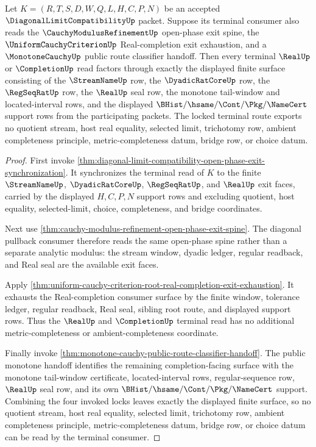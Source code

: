 \begin{theorem}
\label{thm:diagonal-limit-compatibility-root-route-triple-lock}
Let $K=(R,T,S,D,W,Q,L,H,C,P,N)$ be an accepted $\DiagonalLimitCompatibilityUp$ packet. Suppose its terminal consumer also reads the $\CauchyModulusRefinementUp$ open-phase exit spine, the $\UniformCauchyCriterionUp$ Real-completion exit exhaustion, and a $\MonotoneCauchyUp$ public route classifier handoff. Then every terminal $\RealUp$ or $\CompletionUp$ read factors through exactly the displayed finite surface consisting of the $\StreamNameUp$ row, the $\DyadicRatCoreUp$ row, the $\RegSeqRatUp$ row, the $\RealUp$ seal row, the monotone tail-window and located-interval rows, and the displayed $\BHist/\hsame/\Cont/\Pkg/\NameCert$ support rows from the participating packets. The locked terminal route exports no quotient stream, host real equality, selected limit, trichotomy row, ambient completeness principle, metric-completeness datum, bridge row, or choice datum.
\end{theorem}
\begin{proof}
First invoke \autoref{thm:diagonal-limit-compatibility-open-phase-exit-synchronization}. It synchronizes the terminal read of $K$ to the finite $\StreamNameUp$, $\DyadicRatCoreUp$, $\RegSeqRatUp$, and $\RealUp$ exit faces, carried by the displayed $H,C,P,N$ support rows and excluding quotient, host equality, selected-limit, choice, completeness, and bridge coordinates.

Next use \autoref{thm:cauchy-modulus-refinement-open-phase-exit-spine}. The diagonal pullback consumer therefore reads the same open-phase spine rather than a separate analytic modulus: the stream window, dyadic ledger, regular readback, and Real seal are the available exit faces.

Apply \autoref{thm:uniform-cauchy-criterion-root-real-completion-exit-exhaustion}. It exhausts the Real-completion consumer surface by the finite window, tolerance ledger, regular readback, Real seal, sibling root route, and displayed support rows. Thus the $\RealUp$ and $\CompletionUp$ terminal read has no additional metric-completeness or ambient-completeness coordinate.

Finally invoke \autoref{thm:monotone-cauchy-public-route-classifier-handoff}. The public monotone handoff identifies the remaining completion-facing surface with the monotone tail-window certificate, located-interval rows, regular-sequence row, $\RealUp$ seal row, and its own $\BHist/\hsame/\Cont/\Pkg/\NameCert$ support. Combining the four invoked locks leaves exactly the displayed finite surface, so no quotient stream, host real equality, selected limit, trichotomy row, ambient completeness principle, metric-completeness datum, bridge row, or choice datum can be read by the terminal consumer.
\end{proof}

